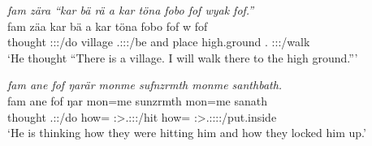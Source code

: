 \begin{exe}
	\ex \emph{fam zära ``kar bä rä a kar töna fobo fof wyak fof.''}\\
	\gll fam zäa kar bä  a kar töna fobo fof w fof\\
	thought \Sg:\Sbj:\Pst:\Pfv/do village \Med{} \Tsg.\F:\Sbj:\Nonpast:\Ipfv/be and place {high.ground} \Dist.\All{} \Emph{} \Fsg:\Sbj:\Nonpast:\Ipfv/walk \Emph{}\\
	\trans `He thought ``There is a village. I will walk there to the high ground.'''\\
	\label{ex654}
\end{exe}
\begin{exe}
	\ex \emph{fam ane fof ŋarär monme sufnzrmth monme santhbath.}\\
	\gll fam ane fof ŋar mon=me sunzrmth mon=me sanath\\
	thought \Dem{} \Emph{} \Stsg.\Sbj:\Nonpast:\Ipfv/do how=\Ins{} \Stpl:\Sbj>\Tsg.\Masc:\Obj:\Pst:\Dur/hit how=\Ins{} \Stpl:\Sbj>\Tsg.\Masc:\Obj:\Pst:\Dur:\Venit/put.inside\\
	\trans `He is thinking how they were hitting him and how they locked him up.'\\
	\label{ex655}
\end{exe}